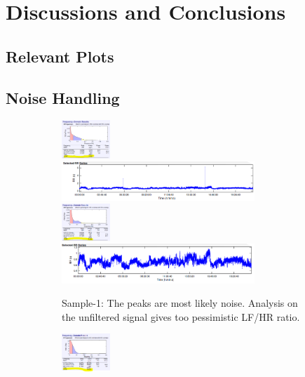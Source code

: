 \documentclass[a4paper, 11pt]{report}\usepackage[]{graphicx}\usepackage[]{color}
\numberwithin{figure}{section}
\begin{document}
\chapter{Discussions and Conclusions}


\nocite{R-data.table,R-ggplot2,R-knitr,R-pls,R-plyr,R-readr,R-reshape2}
\printbibliography

\begin{appendices}
\chapter{Relevant Plots}
\section{Noise Handling}
\begin{figure}[H]
\centering
\begin{subfigure}[t]{\textwidth}
\includegraphics[width = 0.2\textwidth]{figure/noiseHandling/NoiseHandling-1}
\includegraphics[width = 0.8\textwidth]{figure/noiseHandling/NoiseHandling-5}
\includegraphics[width = 0.2\textwidth]{figure/noiseHandling/NoiseHandling-2}
\includegraphics[width = 0.8\textwidth]{figure/noiseHandling/NoiseHandling-6}
\caption{Sample-1: The peaks are most likely noise. Analysis on the unfiltered signal gives too pessimistic LF/HR ratio.}
\label{fig:noiseHandling-s1}
\end{subfigure}
\begin{subfigure}[t]{\textwidth}
\includegraphics[width = 0.2\textwidth]{figure/noiseHandling/NoiseHandling-3}

\end{subfigure}
\end{figure}
\end{appendices}
\end{document}
